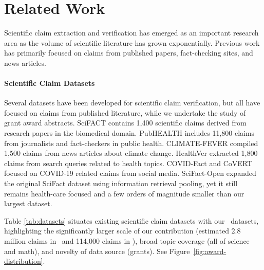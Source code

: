 \documentclass[11pt]{article}
\begin{document}
\section{Related Work}
\label{sec:related-work}

Scientific claim extraction and verification has emerged as an important research area as the volume of scientific literature has grown exponentially. Previous work has primarily focused on claims from published papers, fact-checking sites, and news articles.

\paragraph{Scientific Claim Datasets} Several datasets have been developed for scientific claim verification, but all have focused on claims from published literature, while we undertake the study of grant award abstracts. SciFACT \cite{wadden-etal-2020} contains 1,400 scientific claims derived from research papers in the biomedical domain. PubHEALTH \cite{kotonya-toni-2020} includes 11,800 claims from journalists and fact-checkers in public health. CLIMATE-FEVER \cite{diggelmann-etal-2020} compiled 1,500 claims from news articles about climate change. HealthVer \cite{sarrouti-etal-2021} extracted 1,800 claims from search queries related to health topics. COVID-Fact \cite{saakyan-etal-2021} and CoVERT \cite{mohr-etal-2022} focused on COVID-19 related claims from social media. SciFact-Open \cite{wadden-etal-2022} expanded the original SciFact dataset using information retrieval pooling, yet it still remains health-care focused and a few orders of magnitude smaller than our largest dataset.

Table \ref{tab:datasets} situates existing scientific claim datasets with our \DatasetName~datasets, highlighting the significantly larger scale of our contribution (estimated 2.8 million claims in \DatasetName~and 114,000 claims in \DatasetNameMatSci), broad topic coverage (all of science and math), and novelty of data source (grants). See Figure~\ref{fig:award-distribution}.
\end{document}
